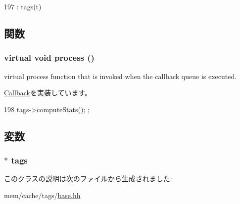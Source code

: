 \begin{DoxyCode}
197 : tags(t) {}
\end{DoxyCode}


\subsection{関数}
\hypertarget{classBaseTagsDumpCallback_a6780fc1879338e1ff38faf7279ec6a0b}{
\subsubsection[{process}]{\setlength{\rightskip}{0pt plus 5cm}virtual void process ()}}
\label{classBaseTagsDumpCallback_a6780fc1879338e1ff38faf7279ec6a0b}
virtual process function that is invoked when the callback queue is executed. 

\hyperlink{classCallback_a142b75b68a6291400e20fb0dd905b1c8}{Callback}を実装しています。


\begin{DoxyCode}
198 { tags->computeStats(); };
\end{DoxyCode}


\subsection{変数}
\hypertarget{classBaseTagsDumpCallback_a6819886aaca345d2e681ba3ef01f96c4}{
\subsubsection[{tags}]{$\ast$ {\bf tags}}}
\label{classBaseTagsDumpCallback_a6819886aaca345d2e681ba3ef01f96c4}


このクラスの説明は次のファイルから生成されました:\begin{DoxyCompactItemize}
\item 
mem/cache/tags/\hyperlink{mem_2cache_2tags_2base_8hh}{base.hh}\end{DoxyCompactItemize}
